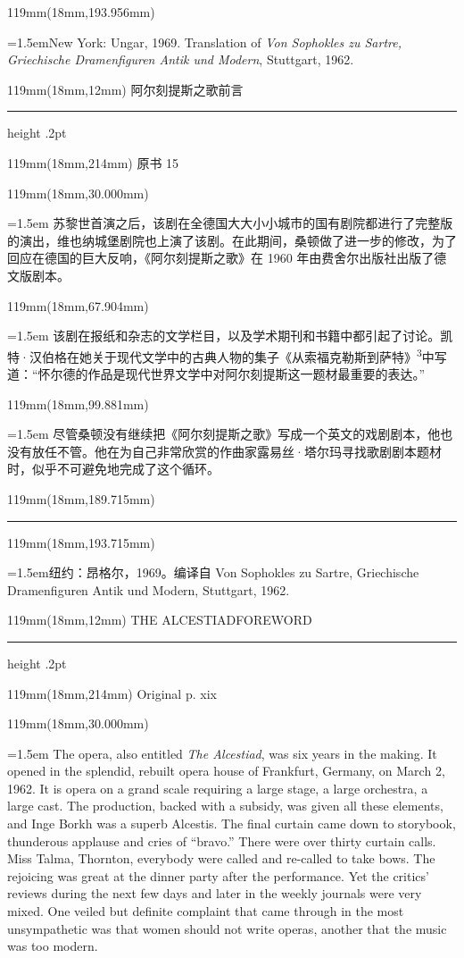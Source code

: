 \documentclass{article}
\newcommand{\ENsetup}{\normalfont\color{ink}\fontsize{11}{16.5}\selectfont\emergencystretch=1.5em}
\newcommand{\ZHsetup}{\normalfont\color{ink}\fontsize{10.5}{17}\selectfont\emergencystretch=1.5em}
\newcommand{\Note}[2]{\par\hangindent=1.5em\hangafter=1\noindent\makebox[1.5em][l]{#1}#2\par}
\newcommand{\Block}[3]{\begin{textblock*}{119mm}(18mm,#1mm){#2 #3\par}\end{textblock*}}
\newcommand{\Heading}[3]{%
  \begin{textblock*}{119mm}(18mm,12mm)
    \color{quiet}\fontsize{7.5}{10}\selectfont
    #1\hfill #2\par\vspace{3mm}\hrule height .2pt
  \end{textblock*}
  \begin{textblock*}{119mm}(18mm,214mm)
    \color{quiet}\fontsize{7}{10}\selectfont #3\hfill\thepage
  \end{textblock*}
}
\begin{document}
\begin{textblock*}{119mm}(18mm,193.956mm)\normalfont\color{ink}\fontsize{7.5}{11}\selectfont \Note{3}{New York: Ungar, 1969. Translation of \textit{Von Sophokles zu Sartre, Griechische Dramenfiguren Antik und Modern}, Stuttgart, 1962.}\end{textblock*}
\newpage
\null
\Heading{阿尔刻提斯之歌}{前言}{原书 15}
\Block{30.000}{\ZHsetup}{苏黎世首演之后，该剧在全德国大大小小城市的国有剧院都进行了完整版的演出，维也纳城堡剧院也上演了该剧。在此期间，桑顿做了进一步的修改，为了回应在德国的巨大反响，《阿尔刻提斯之歌》在 1960 年由费舍尔出版社出版了德文版剧本。\par }
\Block{67.904}{\ZHsetup}{该剧在报纸和杂志的文学栏目，以及学术期刊和书籍中都引起了讨论。凯特·汉伯格在她关于现代文学中的古典人物的集子《从索福克勒斯到萨特》\textsuperscript{3}中写道：“怀尔德的作品是现代世界文学中对阿尔刻提斯这一题材最重要的表达。”\par }
\Block{99.881}{\ZHsetup}{尽管桑顿没有继续把《阿尔刻提斯之歌》写成一个英文的戏剧剧本，他也没有放任不管。他在为自己非常欣赏的作曲家露易丝·塔尔玛寻找歌剧剧本题材时，似乎不可避免地完成了这个循环。\par }
\begin{textblock*}{119mm}(18mm,189.715mm)\color{ink}\rule{30mm}{.25pt}\end{textblock*}
\begin{textblock*}{119mm}(18mm,193.715mm)\normalfont\color{ink}\fontsize{7.5}{11}\selectfont \Note{3}{纽约：昂格尔，1969。编译自 Von Sophokles zu Sartre, Griechische Dramenfiguren Antik und Modern, Stuttgart, 1962.}\end{textblock*}
\newpage
\null
\Heading{THE ALCESTIAD}{FOREWORD}{Original p. xix}
\Block{30.000}{\ENsetup}{The opera, also entitled \textit{The Alcestiad}, was six years in the making. It opened in the splendid, rebuilt opera house of Frankfurt, Germany, on March 2, 1962. It is opera on a grand scale requiring a large stage, a large orchestra, a large cast. The production, backed with a subsidy, was given all these elements, and Inge Borkh was a superb Alcestis. The final curtain came down to storybook, thunderous applause and cries of ``bravo.'' There were over thirty curtain calls. Miss Talma, Thornton, everybody were called and re-called to take bows. The rejoicing was great at the dinner party after the performance. Yet the critics' reviews during the next few days and later in the weekly journals were very mixed. One veiled but definite complaint that came through in the most unsympathetic was that women should not write operas, another that the music was too modern.\par}
\end{document}
